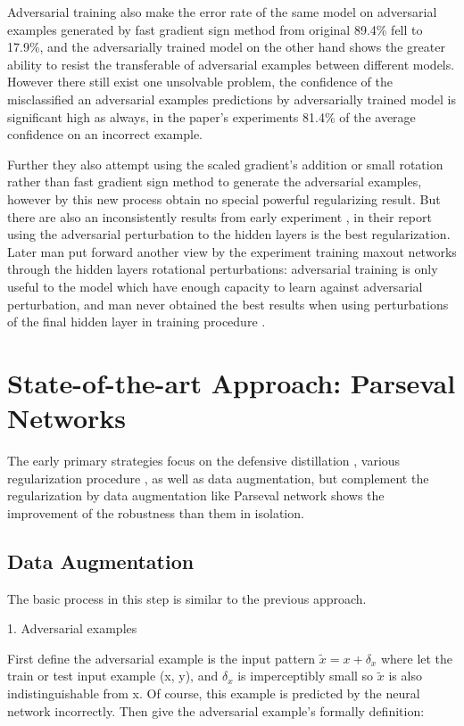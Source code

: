 Adversarial training also make the error rate of the same model on adversarial examples generated by fast gradient sign method from original 89.4\% fell to 17.9\%, and the adversarially trained model on the other hand shows the greater ability to resist the transferable of adversarial examples between different models. However there still exist one unsolvable problem, the confidence of the misclassified an adversarial examples predictions by adversarially trained model is significant high as always, in the paper's experiments 81.4\% of the average confidence on an incorrect example.

Further they also attempt using the scaled gradient's addition or small rotation rather than fast gradient sign method to generate the adversarial examples, however by this new process obtain no special powerful regularizing result. But there are also an inconsistently results from early experiment \cite{szegedy2013intriguing}, in their report using the adversarial perturbation to the hidden layers is the best regularization. Later man put forward another view by the experiment training maxout networks through the hidden layers rotational perturbations: adversarial training  is only useful to the model which have enough capacity to learn against adversarial perturbation, and man never obtained the best results when using perturbations of the final hidden layer in training procedure \cite{goodfellow2014explaining}.

\section{State-of-the-art Approach: Parseval Networks}

The early primary strategies focus on the defensive distillation \cite{papernot2016distillation}, various regularization procedure \cite{gu2014towards}, as well as data augmentation, but complement the regularization by data augmentation like Parseval network shows the improvement of the robustness than them in isolation.

\subsection{Data Augmentation}
The basic process in this step is similar to the previous approach.

1. Adversarial examples

First define the adversarial example is the input pattern $\tilde{x} = x + \delta_x$ where let the train or test input example (x, y), and $\delta_x$ is imperceptibly small so $\tilde{x}$ is also indistinguishable from x. Of course, this example is predicted by the neural network incorrectly. Then give the adversarial example's formally definition:

